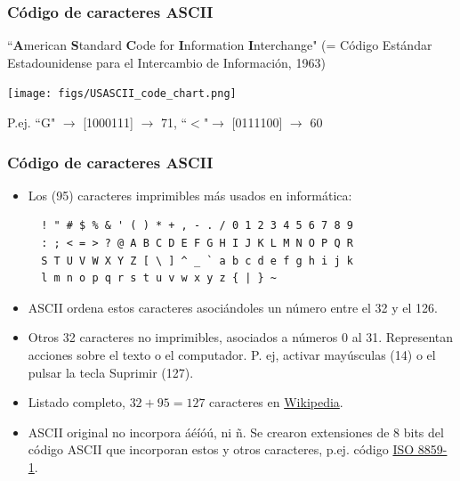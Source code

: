 \documentclass[aspectratio=169]{beamer}
\begin{document}
\begin{frame}[fragile]\frametitle{Código de caracteres ASCII}
\begin{block}{}
``\textbf{A}merican \textbf{S}tandard \textbf{C}ode for \textbf{I}nformation \textbf{I}nterchange" (= Código Estándar Estadounidense para el Intercambio de Información, 1963)
\end{block}
\begin{center}
	\texttt{[image: figs/USASCII\_code\_chart.png]}
\end{center}
 P.ej. ``G" $\rightarrow$ [1000111] $\rightarrow$ 71, \qquad  ``$<$"$ \rightarrow$ [0111100] $\rightarrow$ 60
\end{frame}


\begin{frame}[fragile]\frametitle{Código de caracteres ASCII}
\begin{itemize}
\item Los (95) caracteres imprimibles más usados en informática:
\begin{verbatim}
  ! " # $ % & ' ( ) * + , - . / 0 1 2 3 4 5 6 7 8 9 
  : ; < = > ? @ A B C D E F G H I J K L M N O P Q R 
  S T U V W X Y Z [ \ ] ^ _ ` a b c d e f g h i j k 
  l m n o p q r s t u v w x y z { | } ~ 
\end{verbatim}
\item ASCII ordena estos caracteres asociándoles un número entre el 32 y el 126. 
\item Otros 32 caracteres no imprimibles, asociados a números 0 al 31. Representan acciones sobre el texto o el computador. P. ej, activar mayúsculas (14) o el pulsar la tecla Suprimir (127). 
\item Listado completo, $32+95 = 127$ caracteres en \href{https://es.wikipedia.org/wiki/ASCII}{Wikipedia}.

\item ASCII original no incorpora áéíóú, ni  \~n. Se crearon extensiones de 8 bits del código ASCII que incorporan estos y otros caracteres, p.ej. código \href{https://es.wikipedia.org/wiki/ISO/IEC_8859-1}{ISO 8859-1}.
\end{itemize}
\end{frame}
\end{document}
